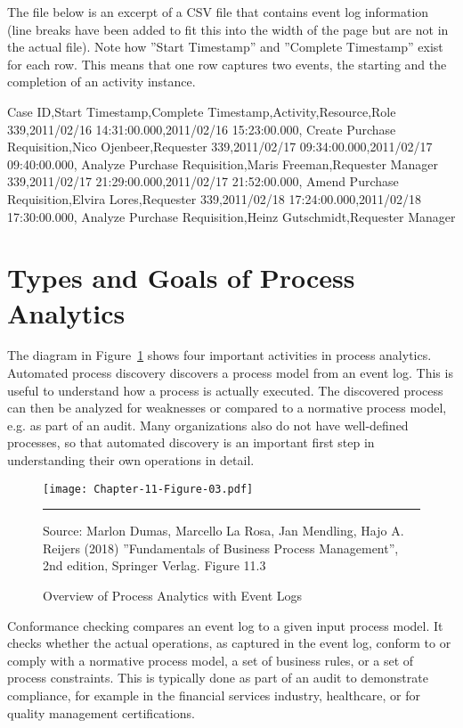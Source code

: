 The file below is an excerpt of a CSV file that contains event log information (line breaks have been added to fit this into the width of the page but are not in the actual file). Note how ''Start Timestamp'' and ''Complete Timestamp'' exist for each row. This means that one row captures two events, the starting and the completion of an activity instance. 

\begin{textcode}
Case ID,Start Timestamp,Complete Timestamp,Activity,Resource,Role
339,2011/02/16 14:31:00.000,2011/02/16 15:23:00.000,
    Create Purchase Requisition,Nico Ojenbeer,Requester
339,2011/02/17 09:34:00.000,2011/02/17 09:40:00.000,
    Analyze Purchase Requisition,Maris Freeman,Requester Manager
339,2011/02/17 21:29:00.000,2011/02/17 21:52:00.000,
    Amend Purchase Requisition,Elvira Lores,Requester
339,2011/02/18 17:24:00.000,2011/02/18 17:30:00.000,
    Analyze Purchase Requisition,Heinz Gutschmidt,Requester Manager
\end{textcode}

\section{Types and Goals of Process Analytics}

The diagram in Figure~\ref{fig:processanalytics} shows four important activities in process analytics. Automated process discovery discovers a process model from an event log. This is useful to understand how a process is actually executed. The discovered process can then be analyzed for weaknesses or compared to a normative process model, e.g. as part of an audit. Many organizations also do not have well-defined processes, so that automated discovery is an important first step in understanding their own operations in detail.

\begin{figure}
\centering
\texttt{[image: Chapter-11-Figure-03.pdf]}\\
\vspace{3mm}\hrule\vspace{2mm}
\scriptsize{Source: Marlon Dumas, Marcello La Rosa, Jan Mendling, Hajo A. Reijers (2018) ''Fundamentals of Business Process Management'', 2nd edition, Springer Verlag. Figure 11.3}
\caption{Overview of Process Analytics with Event Logs}
\label{fig:processanalytics}
\end{figure}

Conformance checking compares an event log to a given input process model. It checks whether the actual operations, as captured in the event log, conform to or comply with a normative process model, a set of business rules, or a set of process constraints. This is typically done as part of an audit to demonstrate compliance, for example in the financial services industry, healthcare, or for quality management certifications. 

